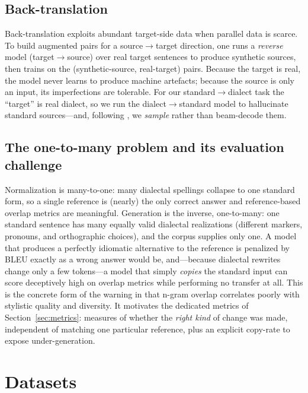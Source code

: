 \documentclass[11pt]{article}
\begin{document}
\subsection{Back-translation}
\label{sec:bg-bt}

Back-translation \citep{sennrich2016improving,edunov2018understanding} exploits
abundant target-side data when parallel data is scarce. To build augmented pairs
for a source$\to$target direction, one runs a \emph{reverse} model
(target$\to$source) over real target sentences to produce synthetic sources, then
trains on the (synthetic-source, real-target) pairs. Because the target is real,
the model never learns to produce machine artefacts; because the source is only an
input, its imperfections are tolerable. For our standard$\rightarrow$dialect task
the ``target'' is real dialect, so we run the dialect$\rightarrow$standard model
to hallucinate standard sources---and, following
\citet{edunov2018understanding}, we \emph{sample} rather than beam-decode them.

\subsection{The one-to-many problem and its evaluation challenge}
\label{sec:bg-one2many}

Normalization is many-to-one: many dialectal spellings collapse to one standard
form, so a single reference is (nearly) the only correct answer and reference-based
overlap metrics are meaningful. Generation is the inverse, one-to-many: one
standard sentence has many equally valid dialectal realizations (different markers,
pronouns, and orthographic choices), and the corpus supplies only one. A model that
produces a perfectly idiomatic alternative to the reference is penalized by BLEU
exactly as a wrong answer would be, and---because dialectal rewrites change only a
few tokens---a model that simply \emph{copies} the standard input can score
deceptively high on overlap metrics while performing no transfer at all. This is
the concrete form of the warning in \citet{edunov2018understanding} that
n-gram overlap correlates poorly with stylistic quality and diversity. It
motivates the dedicated metrics of Section~\ref{sec:metrics}: measures of whether
the \emph{right kind} of change was made, independent of matching one particular
reference, plus an explicit copy-rate to expose under-generation.

\section{Datasets}
\label{sec:data}
\end{document}
